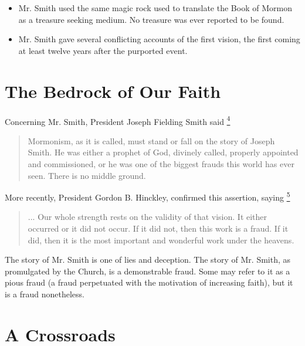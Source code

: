\documentclass[a4paper]{article}
\providecommand*{\DUfootnotemark}[3]{%
  \raisebox{1em}{\hypertarget{#1}{}}%
  \hyperlink{#2}{\textsuperscript{#3}}%
}
\begin{document}
\begin{itemize}
\item Mr. Smith used the same magic rock used to translate the Book of Mormon as a treasure seeking medium.  No treasure was ever reported to be found.

\item Mr. Smith gave several conflicting accounts of the first vision, the first coming at least twelve years after the purported event.

\end{itemize}


\section{The Bedrock of Our Faith%
  \label{the-bedrock-of-our-faith}%
}

Concerning Mr. Smith, President Joseph Fielding Smith said\DUfootnotemark{id6}{id15}{4}
%
\begin{quote}

Mormonism, as it is called, must stand or fall on the story of Joseph Smith.  He was either a prophet of God, divinely called, properly appointed and commissioned, or he was one of the biggest frauds this world has ever seen.  There is no middle ground.

\end{quote}

More recently, President Gordon B. Hinckley, confirmed this assertion, saying\DUfootnotemark{id7}{id16}{5}
%
\begin{quote}

... Our whole strength rests on the validity of that vision.  It either occurred or it did not occur.  If it did not, then this work is a fraud.  If it did, then it is the most important and wonderful work under the heavens.

\end{quote}

The story of Mr. Smith is one of lies and deception.  The story of Mr. Smith, as promulgated by the Church, is a demonstrable fraud.  Some may refer to it as a pious fraud (a fraud perpetuated with the motivation of increasing faith), but it is a fraud nonetheless.


\section{A Crossroads%
  \label{a-crossroads}%
}
\end{document}
